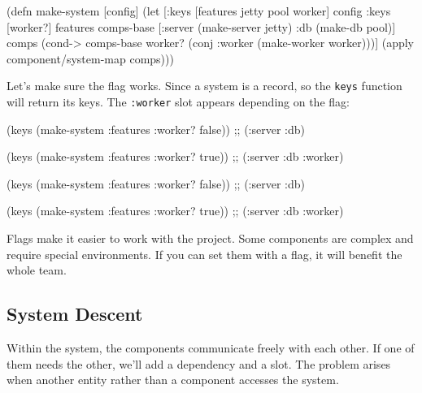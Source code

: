 \else

\begin{english}
  \begin{clojure}
(defn make-system [config]
  (let [{:keys [features jetty pool worker]} config
        {:keys [worker?]} features
        comps-base [:server (make-server jetty)
                    :db (make-db pool)]
        comps (cond-> comps-base
                worker?
                (conj :worker (make-worker worker)))]
    (apply component/system-map comps)))
  \end{clojure}
\end{english}

\fi

Let's make sure the flag works. Since a system is a record, so the \verb|keys| function will return its keys. The \verb|:worker| slot appears depending on the flag:

\ifnarrow

\begin{english}
  \begin{clojure}
(keys (make-system
        {:features {:worker? false}}))
;; (:server :db)

(keys (make-system
        {:features {:worker? true}}))
;; (:server :db :worker)
  \end{clojure}
\end{english}

\else

\begin{english}
  \begin{clojure}
(keys (make-system {:features {:worker? false}}))
;; (:server :db)

(keys (make-system {:features {:worker? true}}))
;; (:server :db :worker)
  \end{clojure}
\end{english}

\fi

Flags make it easier to work with the project. Some components are complex and require special environments. If you can set them with a flag, it will benefit the whole team.

\subsection{System Descent}


Within the system, the components communicate freely with each other. If one of them needs the other, we'll add a dependency and a slot. The problem arises when another entity rather than a component accesses the system.

